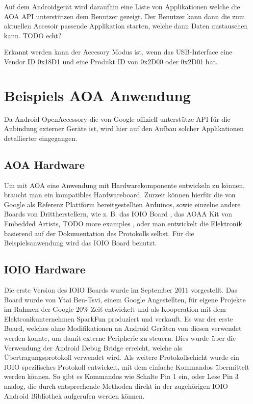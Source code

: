 \documentclass[12pt,journal,compsoc]{IEEEtran}
\begin{document}
Auf dem Androidgerät wird daraufhin eine Liste von Applikationen welche die AOA API unterstützen dem Benutzer gezeigt. Der Benutzer kann dann die zum aktuellen Accesoir passende Applikation starten, welche dann Daten austauschen kann. TODO echt?


Erkannt werden kann der Accesory Modus ist, wenn das USB-Interface eine Vendor ID 0x18D1 und eine Produkt ID von 0x2D00 oder 0x2D01 hat. 

\section{Beispiels AOA Anwendung}
Da Android OpenAccessory die von Google offiziell unterstütze API für die Anbindung externer Geräte ist, wird hier auf den Aufbau solcher Applikationen detallierter eingegangen.
\subsection{AOA Hardware}
Um mit AOA eine Anwendung mit Hardwarekomponente entwickeln zu können, braucht man ein kompatibles Hardwareboard.
Zurzeit können hierfür die von Google als Referenz Plattform bereitgestellten Arduinos, sowie einzelne andere Boards von Drittherstellern, wie z. B. das IOIO Board \cite{ioio}, das AOAA Kit von Embedded Artists\cite{aoaa},  TODO more examples , oder man entwickelt die Elektronik basierend auf der Dokumentation des Protokolls selbst\cite{aoaprotocol2}.
Für die Beispielsanwendung wird das IOIO Board benutzt.

\subsection{IOIO Hardware}
Die erste Version des IOIO Boards wurde im September 2011 vorgestellt. Das Board wurde von Ytai Ben-Tsvi, einem Google Angestellten, für eigene Projekte im Rahmen der Google 20\% Zeit entwickelt und als Kooperation mit dem Elektronikunternehmen SparkFun produziert und verkauft.
Es war der erste Board, welches ohne Modifikationen an Android Geräten von diesen verwendet werden konnte, um damit externe Peripherie zu steuern.
Dies wurde über die Verwendung der Android Debug Bridge erreicht, welche als Übertragungsprotokoll verwendet wird.
Als weitere Protokollschicht wurde ein IOIO spezifisches Protokoll entwickelt, mit dem einfache Kommandos übermittelt werden können.
So gibt es Kommandos wie \glqq Schalte Pin 1 ein\grqq, oder \glqq Lese Pin 3 analog\grqq, die durch entsprechende Methoden direkt in der zugehörigen IOIO Android Bibliothek aufgerufen werden können.
\end{document}
